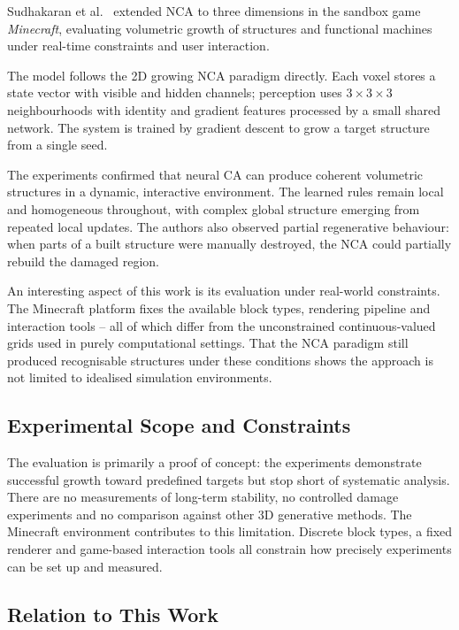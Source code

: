 Sudhakaran et al.~\cite{Sudhakaran2021} extended NCA to three dimensions in the
sandbox game \emph{Minecraft}, evaluating volumetric growth of structures and
functional machines under real-time constraints and user interaction.

The model follows the 2D growing NCA paradigm directly. Each voxel stores a state
vector with visible and hidden channels; perception uses $3 \times 3 \times 3$
neighbourhoods with identity and gradient features processed by a small shared
network. The system is trained by gradient descent to grow a target structure from
a single seed.

The experiments confirmed that neural CA can produce coherent volumetric structures
in a dynamic, interactive environment. The learned rules remain local and homogeneous
throughout, with complex global structure emerging from repeated local updates. The
authors also observed partial regenerative behaviour: when parts of a built structure
were manually destroyed, the NCA could partially rebuild the damaged region.

An interesting aspect of this work is its evaluation under real-world constraints.
The Minecraft platform fixes the available block types, rendering pipeline and
interaction tools -- all of which differ from the unconstrained continuous-valued
grids used in purely computational settings. That the NCA paradigm still produced
recognisable structures under these conditions shows the approach is not limited to
idealised simulation environments.

\subsection{Experimental Scope and Constraints}

The evaluation is primarily a proof of concept: the experiments demonstrate successful
growth toward predefined targets but stop short of systematic analysis. There are no
measurements of long-term stability, no controlled damage experiments and no
comparison against other 3D generative methods. The Minecraft environment contributes 
to this limitation. Discrete block types, a fixed renderer and game-based interaction
tools all constrain how precisely experiments can be set up and measured.

\subsection{Relation to This Work}


